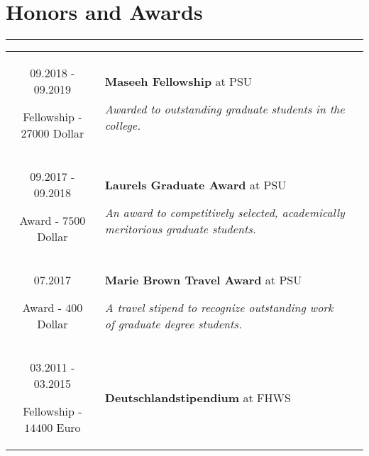 \documentclass[10pt]{article}
\begin{document}
\section*{Honors and Awards}
\vspace{-0.3cm}
{\color{E6E6E6} \hrule height 0.04cm}
\vspace{0.4cm}
\renewcommand{\arraystretch}{1.0}
\begin{tabular}{C Z D}
	{
		09.2018 - 09.2019
		
		\vspace{-0.05cm}
		
		{\scriptsize Fellowship - \(27000\) Dollar}
	}
	&
	{
		{\bf Maseeh Fellowship} {\scriptsize at PSU}
		
		\vspace{0.05cm}
		
		{\scriptsize \it Awarded to outstanding graduate students in the college.}
		
		\vspace{0.0cm}
	}
	\\
	{
		09.2017 - 09.2018
		
		\vspace{-0.05cm}
		
		{\scriptsize Award - \(7500\) Dollar}
	}
	&
	{
		{\bf Laurels Graduate Award} {\scriptsize at PSU} %
		
		\vspace{0.05cm}
		
		{\scriptsize \it An award to competitively selected, academically meritorious graduate students.}
		
		\vspace{0.0cm}
	}
	\\
	{
		07.2017
		
		\vspace{-0.05cm}
		
		{\scriptsize Award - \(400\) Dollar}
	}
	&
	{
		{\bf Marie Brown Travel Award} {\scriptsize at PSU}
		
		\vspace{0.05cm}
		
		{\scriptsize \it A travel stipend to recognize outstanding work of graduate degree students.}
		
		\vspace{0.0cm}
	}
	\\
	{
		03.2011 - 03.2015
		
		\vspace{-0.05cm}
		
		{\scriptsize Fellowship - \(14400\) Euro}
	}
	&
	{
		{\bf Deutschlandstipendium} {\scriptsize at FHWS}
		
}
\end{tabular}
\end{document}
